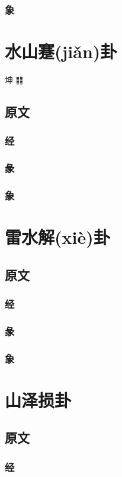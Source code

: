 \documentclass[12pt,oneside]{book}
\begin{document}
\subsection{象}


\chapter{水山蹇(jiǎn)卦}
坤 ䷁

\section{原文}
\subsection{经}
\subsection{彖}
\subsection{象}

\chapter{雷水解(xiè)卦}
\section{原文}
\subsection{经}
\subsection{彖}
\subsection{象}

\chapter{山泽损卦}
\section{原文}
\subsection{经}
\end{document}
